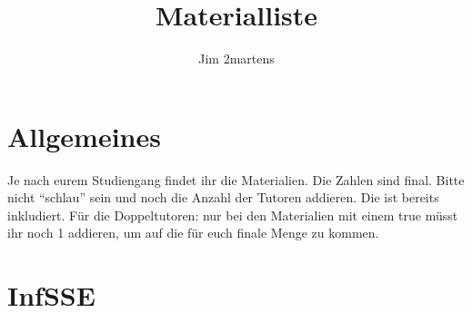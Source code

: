 \documentclass[10pt,a4paper,oneside,ngerman,numbers=noenddot]{scrartcl}
\begin{document}
\author{Jim 2martens}
\title{Materialliste}
\maketitle

\tableofcontents

\section{Allgemeines}

Je nach eurem Studiengang findet ihr die Materialien. Die Zahlen 
sind final. Bitte nicht "`schlau"' sein und noch die Anzahl der 
Tutoren addieren. Die ist bereits inkludiert. Für die 
Doppeltutoren: nur bei den Materialien mit einem true müsst
ihr noch 1 addieren, um auf die für euch finale Menge zu
kommen.


\section{InfSSE}
\end{document}
